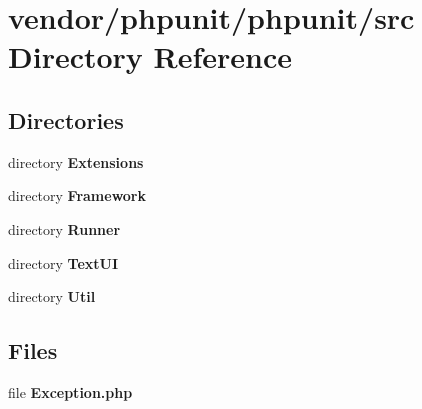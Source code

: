 \section{vendor/phpunit/phpunit/src Directory Reference}
\label{dir_da15976bef7f4ba1fe5adb3e418dc0ab}
\subsection*{Directories}
\begin{DoxyCompactItemize}
\item 
directory {\bf Extensions}
\item 
directory {\bf Framework}
\item 
directory {\bf Runner}
\item 
directory {\bf Text\+U\+I}
\item 
directory {\bf Util}
\end{DoxyCompactItemize}
\subsection*{Files}
\begin{DoxyCompactItemize}
\item 
file {\bf Exception.\+php}
\end{DoxyCompactItemize}
